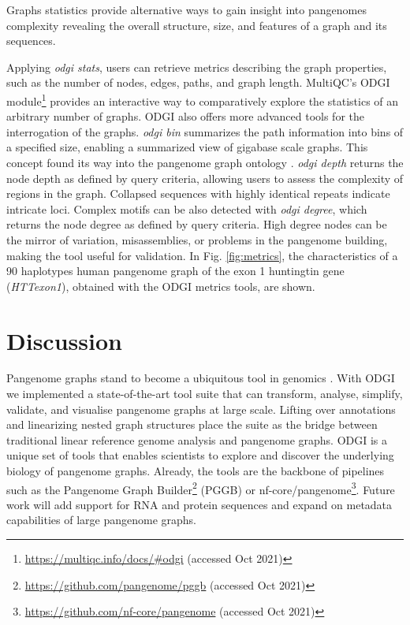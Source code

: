\documentclass{bioinfo}
\begin{document}


Graphs statistics provide alternative ways to gain insight into pangenomes complexity revealing the overall structure, size, and features of a graph and its sequences.

Applying \textit{odgi stats}, users can retrieve metrics describing the graph properties, such as the number of nodes, edges, paths, and graph length.
MultiQC's \citep{Ewels_2016} ODGI module\footnote{\url{https://multiqc.info/docs/\#odgi} (accessed Oct 2021)} provides an interactive way to comparatively explore the statistics of an arbitrary number of graphs.
ODGI also offers more advanced tools for the interrogation of the graphs. \textit{odgi bin} summarizes the path information into bins of a specified size, enabling a summarized view of gigabase scale graphs.
This concept found its way into the pangenome graph ontology \cite{Yokoyama2020}. \textit{odgi depth} returns the node depth as defined by query criteria, allowing users to assess the complexity of regions in the graph.
Collapsed sequences with highly identical repeats indicate intricate loci.
Complex motifs can be also detected with \textit{odgi degree}, which returns the node degree as defined by query criteria.
High degree nodes can be the mirror of variation, misassemblies, or problems in the pangenome building, making the tool useful for validation.
In Fig. \ref{fig:metrics}, the characteristics of a 90 haplotypes human pangenome graph of the exon 1 huntingtin gene \citep{Sathasivam2013,Neueder2017} (\textit{HTTexon1}), obtained with the ODGI metrics tools, are shown.

%






\section{Discussion}


Pangenome graphs stand to become a ubiquitous tool in genomics \citep{Eizenga_2020}. With ODGI we implemented a state-of-the-art tool suite that can transform, analyse, simplify, validate, and visualise pangenome graphs at large scale.
%
Lifting over annotations and linearizing nested graph structures place the suite as the bridge between traditional linear reference genome analysis and pangenome graphs. ODGI is a unique set of tools that enables scientists to explore and discover the underlying biology of pangenome graphs. Already, the tools are the backbone of pipelines such as the Pangenome Graph Builder\footnote{\url{https://github.com/pangenome/pggb} (accessed Oct 2021)} (PGGB) or nf-core/pangenome\footnote{\url{https://github.com/nf-core/pangenome} (accessed Oct 2021)}. Future work will add support for RNA and protein sequences and expand on metadata capabilities of large pangenome graphs.
\end{document}
